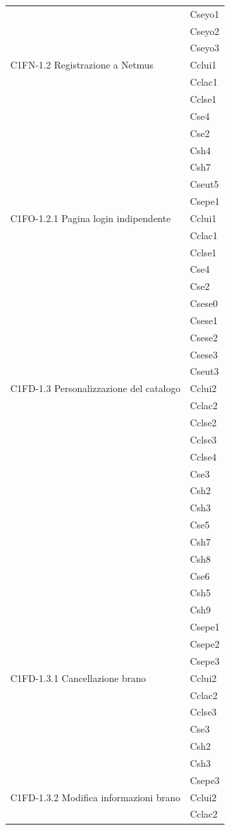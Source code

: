\begin{footnotesize}
\begin{longtable}[!h]{|l|l|}
& Cseyo1\\
& Cseyo2\\
& Cseyo3\\\hline
C1FN-1.2 Registrazione a Netmus & Cclui1\\
& Cclac1\\
& Cclse1\\
& Cse4\\
& Cse2\\
& Csh4\\
& Csh7\\
& Cseut5\\
& Csepe1\\\hline
C1FO-1.2.1 Pagina login indipendente & Cclui1\\
& Cclac1\\
& Cclse1\\
& Cse4\\
& Cse2\\
& Csese0\\
& Csese1\\
& Csese2\\
& Csese3\\
& Cseut3\\\hline
C1FD-1.3 Personalizzazione del catalogo & Cclui2\\
& Cclac2\\
& Cclse2\\
& Cclse3\\
& Cclse4\\
& Cse3\\
& Csh2\\
& Csh3\\
& Cse5\\
& Csh7\\
& Csh8\\
& Cse6\\
& Csh5\\
& Csh9\\
& Csepe1\\
& Csepe2\\
& Csepe3\\\hline 
C1FD-1.3.1 Cancellazione brano & Cclui2\\
& Cclac2\\
& Cclse3\\
& Cse3\\
& Csh2\\
& Csh3\\
& Csepe3\\\hline  
C1FD-1.3.2 Modifica informazioni brano & Cclui2\\
& Cclac2\\

\end{longtable}
\end{footnotesize}
